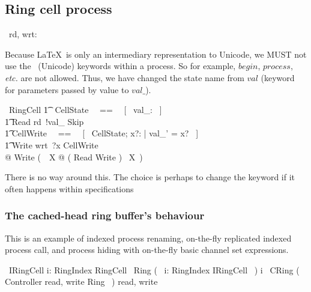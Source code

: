 \documentclass{article}
\begin{document}
\subsection{Ring cell process}

\begin{circus}
  \circchannel\ rd, wrt: \nat
\end{circus}

Because \LaTeX\ is only an intermediary representation to Unicode,
we MUST not use the \Circus\ (Unicode) keywords within a process.
So for example, $begin$, $process$, \textit{etc.} are not allowed.
Thus, we have changed the state name from $val$ (keyword for parameters
passed by value to $val\_$).
\begin{circus}
  \circprocess\ RingCell \circdef \circbegin
  \also
    \t1 \circstate\ CellState ~~==~~ [~ val\_: \nat ~] \\
    \t1 Read \circdef rd~!val\_ \then Skip \\
    \t1 CellWrite ~~==~~ [~ \Delta CellState; x?: \nat | val\_' = x? ~] \\
    \t1 Write \circdef wrt~?x \then CellWrite \\
    @ Write \circseq (~\circmu\ X @ ( Read \extchoice Write ) \circseq\ X~) \\
  \circend
\end{circus}
%
There is no way around this. The choice is perhaps to change the keyword
if it often happens within specifications

\subsubsection{The cached-head ring buffer's behaviour}

This is an example of indexed process renaming,
on-the-fly replicated indexed process call, and
process hiding with on-the-fly basic channel set expressions.
\begin{circus}
  \circprocess\ IRingCell \circdef i: RingIndex \circindex RingCell %
  \also
  \circprocess\ Ring \circdef (~ \Interleave i: RingIndex \circindex IRingCell ~) \circlinst i \circrinst
  \also
  \circprocess\ CRing \circdef (~ Controller \lpar \lchanset read, write \rchanset \rpar Ring ~) \circhide \lchanset read, write \rchanset
\end{circus}
\end{document}
